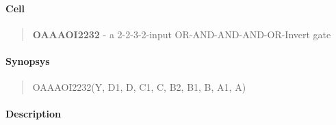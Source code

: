 \label{OAAAOI2232}
\paragraph{Cell}
\begin{quote}
    \textbf{OAAAOI2232} - a 2-2-3-2-input OR-AND-AND-AND-OR-Invert gate
\end{quote}

\paragraph{Synopsys}
\begin{quote}
    OAAAOI2232(Y, D1, D, C1, C, B2, B1, B, A1, A)
\end{quote}

\paragraph{Description}

%


